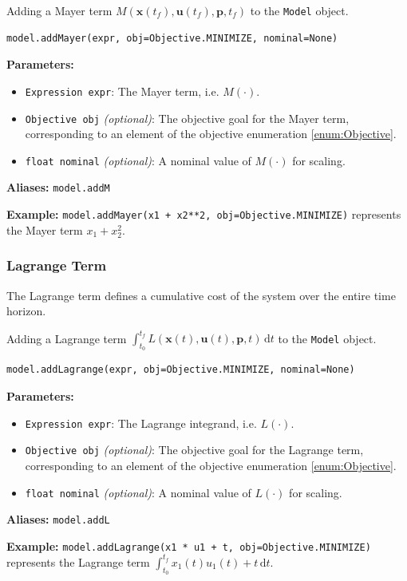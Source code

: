 \documentclass[12pt]{article}
\renewcommand{\v}{\bm}
\begin{document}
\begin{mdframed}[backgroundcolor=gray!10, roundcorner=10pt,
		linewidth=1pt]

	Adding a Mayer term $M(\v{x}(t_f), \v{u}(t_f), \v{p}, t_f)$ to
	the \texttt{Model} object.

	\begin{lstlisting}
model.addMayer(expr, obj=Objective.MINIMIZE, nominal=None)
		\end{lstlisting}
	\label{addMayer}
	\textbf{Parameters:}
	\begin{itemize}
		\item \texttt{Expression expr}: The Mayer term, i.e.
		      $M(\cdot)$.
		\item \texttt{Objective obj} \emph{(optional)}: The
		      objective goal for the Mayer term, corresponding to an
		      element of the objective
		      enumeration \ref{enum:Objective}.
		\item \texttt{float nominal} \emph{(optional)}: A
		      nominal value of $M(\cdot)$ for scaling.
	\end{itemize}

	\textbf{Aliases:}  \texttt{model.addM}

	\textbf{Example:} \texttt{model.addMayer(x1 + x2**2,
		obj=Objective.MINIMIZE)} represents the Mayer term
	$x_1 + x_2^2$.
\end{mdframed}

\subsubsection{Lagrange Term}

The Lagrange term defines a cumulative cost of the system over the
entire time horizon.

\begin{mdframed}[backgroundcolor=gray!10, roundcorner=10pt,
		linewidth=1pt]

	Adding a Lagrange term $\int_{t_0}^{t_f} L(\v{x}(t), \v{u}(t),
		\v{p}, t) \, \mathrm{d}t$ to the \texttt{Model} object.

	\begin{lstlisting}
model.addLagrange(expr, obj=Objective.MINIMIZE, nominal=None)
	 	\end{lstlisting}
	\label{addLagrange}
	\textbf{Parameters:}
	\begin{itemize}
		\item \texttt{Expression expr}: The Lagrange integrand,
		      i.e. $L(\cdot)$.
		\item \texttt{Objective obj} \emph{(optional)}: The
		      objective goal for the Lagrange term, corresponding to an
		      element of the
		      objective enumeration \ref{enum:Objective}.
		\item \texttt{float nominal} \emph{(optional)}: A
		      nominal value of $L(\cdot)$ for scaling.
	\end{itemize}

	\textbf{Aliases:}  \texttt{model.addL}

	\textbf{Example:} \texttt{model.addLagrange(x1 * u1 + t,
		obj=Objective.MINIMIZE)} represents the Lagrange term
	$\int_{t_0}^{t_f} x_1(t) u_1(t) + t \, \mathrm{d}t$.
\end{mdframed}
\end{document}
